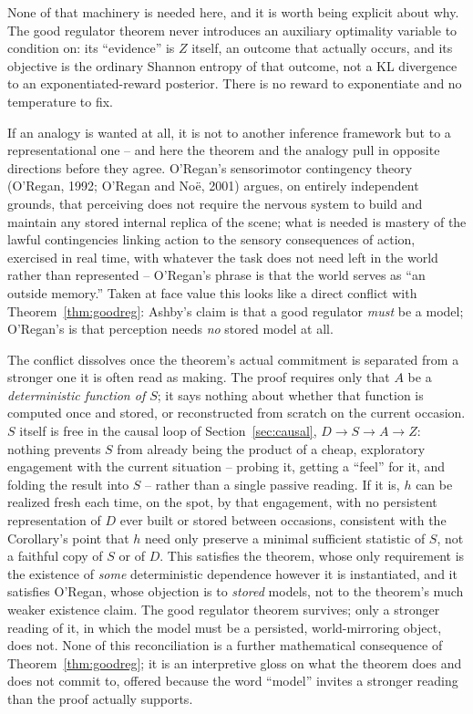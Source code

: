 \documentclass[11pt]{article}
\theoremstyle{definition}
\theoremstyle{remark}
\begin{document}
None of that machinery is needed here, and it is worth being explicit
about why. The good regulator theorem never introduces an auxiliary
optimality variable to condition on: its ``evidence'' is $Z$ itself, an
outcome that actually occurs, and its objective is the ordinary Shannon
entropy of that outcome, not a KL divergence to an exponentiated-reward
posterior. There is no reward to exponentiate and no temperature to fix.

If an analogy is wanted at all, it is not to another inference framework
but to a representational one -- and here the theorem and the analogy
pull in opposite directions before they agree. O'Regan's sensorimotor
contingency theory (O'Regan, 1992; O'Regan and No\"e, 2001) argues, on
entirely independent grounds, that perceiving does not require the
nervous system to build and maintain any stored internal replica of the
scene; what is needed is mastery of the lawful contingencies linking
action to the sensory consequences of action, exercised in real time,
with whatever the task does not need left in the world rather than
represented -- O'Regan's phrase is that the world serves as ``an outside
memory.'' Taken at face value this looks like a direct conflict with
Theorem~\ref{thm:goodreg}: Ashby's claim is that a good regulator
\emph{must} be a model; O'Regan's is that perception needs \emph{no}
stored model at all.

The conflict dissolves once the theorem's actual commitment is separated
from a stronger one it is often read as making. The proof requires only
that $A$ be a \emph{deterministic function of $S$}; it says nothing about
whether that function is computed once and stored, or reconstructed from
scratch on the current occasion. $S$ itself is free in the causal loop of
Section~\ref{sec:causal}, $D\to S\to A\to Z$: nothing prevents $S$ from
already being the product of a cheap, exploratory engagement with the
current situation -- probing it, getting a ``feel'' for it, and folding
the result into $S$ -- rather than a single passive reading. If it is,
$h$ can be realized fresh each time, on the spot, by that engagement, with
no persistent representation of $D$ ever built or stored between
occasions, consistent with the Corollary's point that $h$ need only
preserve a minimal sufficient statistic of $S$, not a faithful copy of $S$
or of $D$. This satisfies the theorem, whose only requirement is the
existence of \emph{some} deterministic dependence however it is
instantiated, and it satisfies O'Regan, whose objection is to
\emph{stored} models, not to the theorem's much weaker existence claim.
The good regulator theorem survives; only a stronger reading of it, in
which the model must be a persisted, world-mirroring object, does not.
None of this reconciliation is a further mathematical consequence of
Theorem~\ref{thm:goodreg}; it is an interpretive gloss on what the
theorem does and does not commit to, offered because the word ``model''
invites a stronger reading than the proof actually supports.
\end{document}

